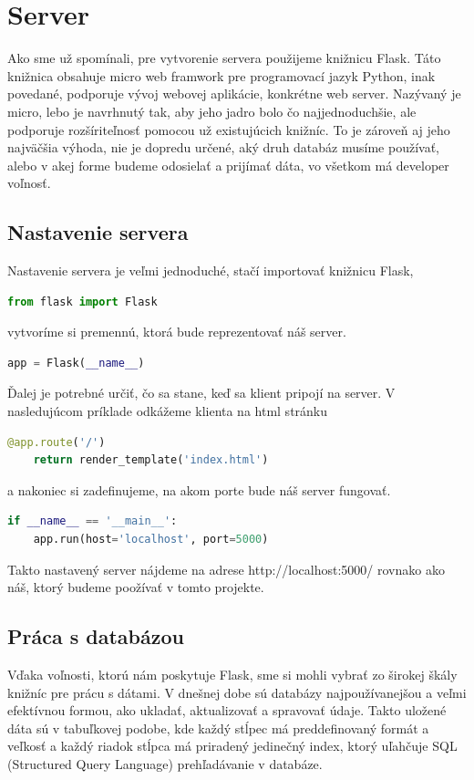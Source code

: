 \section{Server}
Ako sme už spomínali, pre vytvorenie servera použijeme knižnicu Flask. Táto knižnica obsahuje micro web framwork pre programovací jazyk Python, inak povedané, podporuje vývoj webovej aplikácie, konkrétne web server. Nazývaný je micro, lebo je navrhnutý tak, aby jeho jadro bolo čo najjednoduchšie, ale podporuje rozšíriteľnosť pomocou už existujúcich knižníc. To je zároveň aj jeho najväčšia výhoda, nie je dopredu určené, aký druh databáz musíme používať, alebo v akej forme budeme odosielať a prijímať dáta, vo všetkom má developer voľnosť.
\subsection{Nastavenie servera}
Nastavenie servera je veľmi jednoduché, stačí importovať knižnicu Flask,
\begin{lstlisting}[language=Python]
from flask import Flask
\end{lstlisting}\noindent
vytvoríme si premennú, ktorá bude reprezentovať náš server.
\begin{lstlisting}[language=Python]
app = Flask(__name__)
\end{lstlisting}\noindent
Ďalej je potrebné určiť, čo sa stane, keď sa klient pripojí na server. V nasledujúcom príklade odkážeme klienta na html stránku
\begin{lstlisting}[language=Python]
@app.route('/')
	return render_template('index.html')
\end{lstlisting}\noindent
a nakoniec si zadefinujeme, na akom porte bude náš server fungovať.
\begin{lstlisting}[language=Python]
if __name__ == '__main__':
	app.run(host='localhost', port=5000)
\end{lstlisting}
Takto nastavený server nájdeme na adrese http://localhost:5000/ rovnako ako náš, ktorý budeme poožívať v tomto projekte.

\subsection{Práca s databázou}
Vďaka voľnosti, ktorú nám poskytuje Flask, sme si mohli vybrať zo širokej škály knižníc pre prácu s dátami. V dnešnej dobe sú databázy najpoužívanejšou a veľmi efektívnou formou, ako ukladať, aktualizovať a spravovať údaje. Takto uložené dáta sú v tabuľkovej podobe, kde každý stĺpec má preddefinovaný formát a veľkosť a každý riadok stĺpca má priradený jedinečný index, ktorý uľahčuje SQL (Structured Query Language) prehľadávanie v databáze.


